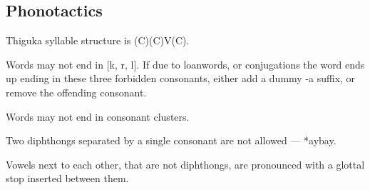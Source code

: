 \subsection{Phonotactics}
Thiguka syllable structure is (C)(C)V(C).

Words may not end in [k, r, l].
If due to loanwords, or conjugations the word ends up ending in these three forbidden consonants, either add a dummy -a suffix, or remove the offending consonant.

Words may not end in consonant clusters.

Two diphthongs separated by a single consonant are not allowed --- *aybay. 

Vowels next to each other, that are not diphthongs, are pronounced with a glottal stop inserted between them.
